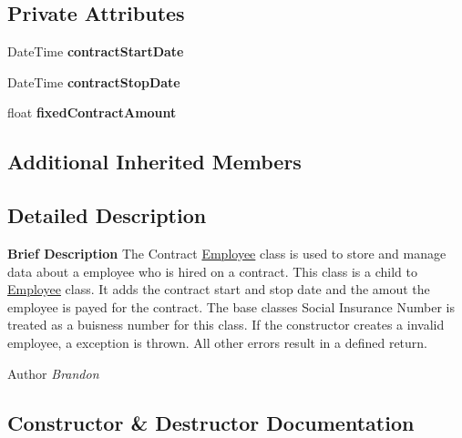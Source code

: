 \subsection*{Private Attributes}
\begin{DoxyCompactItemize}
\item 
\hypertarget{class_all_employees_1_1_contract_employee_aeef462cc8bd0639b674bba0632b6586b}{}Date\+Time {\bfseries contract\+Start\+Date}\label{class_all_employees_1_1_contract_employee_aeef462cc8bd0639b674bba0632b6586b}

\item 
\hypertarget{class_all_employees_1_1_contract_employee_ab549d2c8addad182fd66246c41ca73b7}{}Date\+Time {\bfseries contract\+Stop\+Date}\label{class_all_employees_1_1_contract_employee_ab549d2c8addad182fd66246c41ca73b7}

\item 
\hypertarget{class_all_employees_1_1_contract_employee_a81526f8517894ce466b70e3ffa61a8a8}{}float {\bfseries fixed\+Contract\+Amount}\label{class_all_employees_1_1_contract_employee_a81526f8517894ce466b70e3ffa61a8a8}

\end{DoxyCompactItemize}
\subsection*{Additional Inherited Members}


\subsection{Detailed Description}
{\bfseries Brief Description} The Contract \hyperlink{class_all_employees_1_1_employee}{Employee} class is used to store and manage data about a employee who is hired on a contract. This class is a child to \hyperlink{class_all_employees_1_1_employee}{Employee} class. It adds the contract start and stop date and the amout the employee is payed for the contract. The base classes Social Insurance Number is treated as a buisness number for this class. If the constructor creates a invalid employee, a exception is thrown. All other errors result in a defined return. 

\begin{DoxyAuthor}{Author}
{\itshape Brandon} 
\end{DoxyAuthor}


\subsection{Constructor \& Destructor Documentation}
\hypertarget{class_all_employees_1_1_contract_employee_afb78892e913ff2a34aed4d7b78d6c9f7}{}
